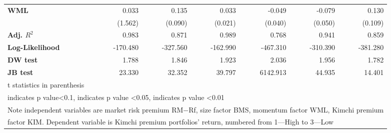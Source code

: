 \documentclass{article}
\begin{document}
\begin{sidewaystable}[htbp]
\begin{tabular}{lllllll}
    \textbf{WML} & \multicolumn{1}{r}{0.033} & \multicolumn{1}{r}{0.135} & \multicolumn{1}{r}{0.033} & \multicolumn{1}{r}{-0.049} & \multicolumn{1}{r}{-0.079} & \multicolumn{1}{r}{0.130} \\
          & \multicolumn{1}{r}{(1.562)} & \multicolumn{1}{r}{(0.090)} & \multicolumn{1}{r}{(0.021)} & \multicolumn{1}{r}{(0.040)} & \multicolumn{1}{r}{(0.050)} & \multicolumn{1}{r}{(0.109)} \\
    \textbf{Adj. \boldmath$R^2$} & \multicolumn{1}{r}{0.983} & \multicolumn{1}{r}{0.871} & \multicolumn{1}{r}{0.989} & \multicolumn{1}{r}{0.768} & \multicolumn{1}{r}{0.941} & \multicolumn{1}{r}{0.859} \\
    \textbf{Log-Likelihood} & \multicolumn{1}{r}{-170.480} & \multicolumn{1}{r}{-327.560} & \multicolumn{1}{r}{-162.990} & \multicolumn{1}{r}{-467.310} & \multicolumn{1}{r}{-310.390} & \multicolumn{1}{r}{-381.280} \\
    \textbf{DW test} & \multicolumn{1}{r}{1.788} & \multicolumn{1}{r}{1.846} & \multicolumn{1}{r}{1.923} & \multicolumn{1}{r}{2.036} & \multicolumn{1}{r}{1.956} & \multicolumn{1}{r}{1.782} \\
    \textbf{JB test} & \multicolumn{1}{r}{23.330} & \multicolumn{1}{r}{32.352} & \multicolumn{1}{r}{39.797} & \multicolumn{1}{r}{6142.913} & \multicolumn{1}{r}{44.935} & \multicolumn{1}{r}{14.401} \\
    \midrule
    \multicolumn{7}{l}{t statistics in parenthesis} \\
    \multicolumn{7}{l}{\hspace{0.2cm}indicates p value\textless0.1,  \hspace{0.3cm} indicates p value \textless 0.05,  \hspace{0.4cm}   indicates p value  \textless 0.01} \\
    \multicolumn{7}{l}{Note independent variables are market risk premium RM−Rf, size factor BMS, momentum factor WML, Kimchi premium} \\
    \multicolumn{7}{l}{factor KIM. Dependent variable is Kimchi premium portfolios' return, numbered from 1—High to 3—Low} \\
    \end{tabular}%
  \label{tab:addlabel}%
\end{sidewaystable}%
\end{document}
